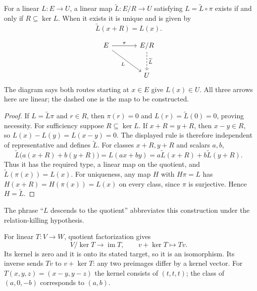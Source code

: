 \begin{theorem}\label{thm:quotient-factorization}
For a linear $L:E\to U$, a linear map $\widetilde L:E/R\to U$ satisfying
$L=\widetilde L\circ \pi$ exists if and only if $R\subseteq\ker L$.
When it exists it is unique and is given by
\[
\widetilde L(x+R)=L(x).
\]
\end{theorem}
\[
\begin{tikzcd}[column sep=large,row sep=large]
E\arrow[r,"\pi"]\arrow[dr,"L"']&E/R\arrow[d,dashed,"\widetilde L"]\\
&U
\end{tikzcd}
\]
The diagram says both routes starting at $x\in E$ give $L(x)\in U$.
All three arrows here are linear; the dashed one is the map to be constructed.
\begin{proof}
If $L=\widetilde L\pi$ and $r\in R$, then $\pi(r)=0$ and
$L(r)=\widetilde L(0)=0$, proving necessity.
For sufficiency suppose $R\subseteq\ker L$. If $x+R=y+R$, then
$x-y\in R$, so $L(x)-L(y)=L(x-y)=0$. The displayed rule is therefore
independent of representative and defines $\widetilde L$.
For classes $x+R,y+R$ and scalars $a,b$,
\[
\widetilde L\bigl(a(x+R)+b(y+R)\bigr)=L(ax+by)
=a\widetilde L(x+R)+b\widetilde L(y+R).
\]
Thus it has the required type, a linear map on the quotient, and
$\widetilde L(\pi(x))=L(x)$. For uniqueness, any map $H$ with $H\pi=L$ has
$H(x+R)=H(\pi(x))=L(x)$ on every class, since $\pi$ is surjective. Hence
$H=\widetilde L$.
\end{proof}
The phrase ``$L$ descends to the quotient'' abbreviates this construction
under the relation-killing hypothesis.

\begin{example}\label{thm:first-isomorphism}
For linear $T:V\to W$, quotient factorization gives
\[
V/\ker T\longrightarrow\operatorname{im}T,\qquad v+\ker T\longmapsto Tv.
\]
Its kernel is zero and it is onto its stated target, so it is an isomorphism.
Its inverse sends $Tv$ to $v+\ker T$: any two preimages differ by a kernel
vector. For $T(x,y,z)=(x-y,y-z)$ the kernel consists of $(t,t,t)$;
the class of $(a,0,-b)$ corresponds to $(a,b)$.
\end{example}

